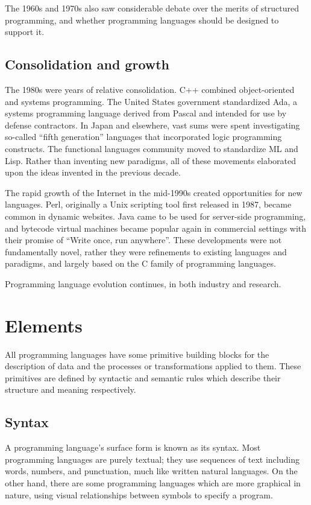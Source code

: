 The 1960s and 1970s also saw considerable debate over the merits of
structured programming, and whether programming languages should be
designed to support it.

\section{Consolidation and growth}
The 1980s were years of relative consolidation. C++ combined
object-oriented and systems programming. The United States government
standardized Ada, a systems programming language derived from Pascal and
intended for use by defense contractors. In Japan and elsewhere, vast sums
were spent investigating so-called ``fifth generation'' languages that
incorporated logic programming constructs. The functional languages
community moved to standardize ML and Lisp. Rather than inventing new
paradigms, all of these movements elaborated upon the ideas invented in the
previous decade.

The rapid growth of the Internet in the mid-1990s created opportunities for
new languages. Perl, originally a Unix scripting tool first released in
1987, became common in dynamic websites. Java came to be used for
server-side programming, and bytecode virtual machines became popular again
in commercial settings with their promise of ``Write once, run anywhere''.
These developments were not funda\-mentally novel, rather they were
refinements to existing languages and paradigms, and largely based on the C
family of programming languages.

Programming language evolution continues, in both industry and research.

\chapter{Elements}
All programming languages have some primitive building blocks for the
de\-scription of data and the processes or transformations applied to them.
These primitives are defined by syntactic and semantic rules which describe
their structure and meaning respectively.

\section{Syntax}
A programming language's surface form is known as its syntax. Most
programm\-ing languages are purely textual; they use sequences of text
including words, numbers, and punctuation, much like written natural
languages. On the other hand, there are some programming languages which
are more graphical in nature, using visual relationships between symbols to
specify a program.

